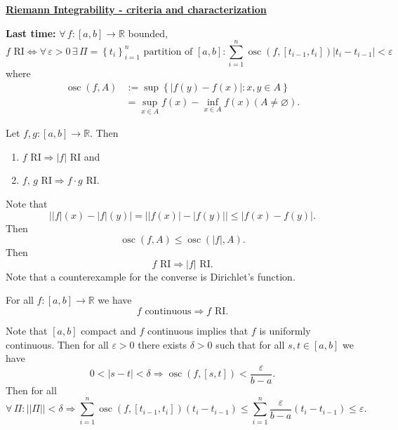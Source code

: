 \documentclass{notes}
\begin{document}
  {\boldmath \bfseries \underline{Riemann Integrability - criteria and characterization}}
  
  {\boldmath \bfseries Last time:} $\forall \, f \colon [a, b] \to \mathbb R$ bounded, 
  \[
    \text{$f$ RI} \Leftrightarrow \forall \, \varepsilon > 0 \, \exists \, \Pi = \left \{ t_i \right \}_{i = 1}^n \text{ partition of $[a, b]$}: \sum_{i = 1}^n \operatorname{osc}(f, [t_{i - 1}, t_i]) \left | t_i - t_{i - 1} \right | < \varepsilon
  \]
  where 
  \begin{align*}
    \operatorname{osc}(f, A) &:= \sup \left \{ \left | f(y) - f(x) \right | : x, y \in A \right \} \\ 
    &= \sup_{x \in A} f(x) - \inf_{x \in A} f(x) (A \neq \varnothing).
  \end{align*}
  
  \begin{lem}
    Let $f, g \colon [a, b] \to \mathbb R$.
    Then 
    \begin{enumerate}
      \item $\text{$f$ RI} \Rightarrow \text{$\left | f \right |$ RI}$ and 

      \item $\text{$f$, $g$ RI} \Rightarrow \text{$f \cdot g$ RI}$.
    \end{enumerate}
  \end{lem}
  
  \begin{prf}
    Note that 
    \[
      \left | \left | f \right |(x) - \left | f \right |(y) \right | = \left | \left | f(x) \right | - \left | f(y) \right | \right | \leq \left | f(x) - f(y) \right |.
    \]
    Then 
    \[
      \operatorname{osc}(f, A) \leq \operatorname{osc}(\left | f \right |, A).
    \]
    Then 
    \[
      \text{$f$ RI} \Rightarrow \text{$\left | f \right |$ RI}.
    \]
    Note that a counterexample for the converse is Dirichlet's function.
  \end{prf}
  
  \begin{thm}
    For all $f \colon [a, b] \to \mathbb R$ we have 
    \[
      \text{$f$ continuous} \Rightarrow \text{$f$ RI}.
    \]
  \end{thm}
  
  \begin{prf}
    Note that $[a, b]$ compact and $f$ continuous implies that $f$ is uniformly continuous.
    Then for all $\varepsilon > 0$ there exists $\delta > 0$ such that for all $s, t \in [a, b]$ we have 
    \[
      0 < \left | s - t \right | < \delta \Rightarrow \operatorname{osc}(f, [s, t]) < \frac{\varepsilon}{b - a}.
    \]
    Then for all 
    \[
      \forall \, \Pi: ||\Pi|| < \delta \Rightarrow \sum_{i = 1}^n \operatorname{osc}(f, [t_{i - 1}, t_i]) (t_i - t_{i - 1}) \leq \sum_{i = 1}^n \frac{\varepsilon}{b - a} (t_i - t_{i - 1}) \leq \varepsilon.
    \]
  \end{prf}
  
\end{document}
